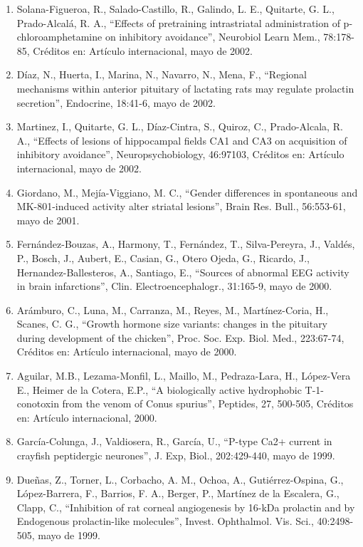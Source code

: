 \begin{enumerate}
\item Solana-Figueroa, R., Salado-Castillo, R., Galindo, L. E., Quitarte, G. L., Prado-Alcalá, R. A., “Effects of pretraining intrastriatal 
administration of p-chloroamphetamine on inhibitory avoidance”, Neurobiol Learn Mem., 78:178-85, Créditos en: Artículo internacional, mayo de 
2002.

\item Díaz, N., Huerta, I., Marina, N., Navarro, N., Mena, F., “Regional mechanisms within anterior pituitary of lactating rats may regulate 
prolactin secretion”, Endocrine, 18:41-6, mayo de 2002.

\item Martinez, I., Quitarte, G. L., Díaz-Cintra, S., Quiroz, C., Prado-Alcala, R. A., “Effects of lesions of hippocampal fields CA1 and CA3 
on 
acquisition of inhibitory avoidance”, Neuropsychobiology, 46:97103, Créditos en: Artículo internacional, mayo de 2002.

\item Giordano, M., Mejía-Viggiano, M. C., “Gender differences in spontaneous and MK-801-induced activity alter striatal lesions”, Brain Res. 
Bull., 56:553-61, mayo de 2001.

\item Fernández-Bouzas, A., Harmony, T., Fernández, T., Silva-Pereyra, J., Valdés, P., Bosch, J., Aubert, E., Casian, G., Otero Ojeda, G., 
Ricardo, 
J., Hernandez-Ballesteros, A., Santiago, E., “Sources of abnormal EEG activity in brain infarctions”, Clin. Electroencephalogr., 31:165-9, 
mayo de 2000.

\item Arámburo, C., Luna, M., Carranza, M., Reyes, M., Martínez-Coria, H., Scanes, C. G., “Growth hormone size variants: changes in the 
pituitary 
during development of the chicken”, Proc. Soc. Exp. Biol. Med., 223:67-74, Créditos en: Artículo internacional, mayo de 2000.

\item Aguilar, M.B., Lezama-Monfil, L., Maillo, M., Pedraza-Lara, H., López-Vera E., Heimer de la Cotera, E.P., “A biologically active 
hydrophobic 
T-1-conotoxin from the venom of Conus spurius”, Peptides, 27, 500-505, Créditos en: Artículo internacional, 2000.

\item García-Colunga, J., Valdiosera, R., García, U., “P-type Ca2+ current in crayfish peptidergic neurones”, J. Exp, Biol., 202:429-440, 
mayo de 
1999.

\item Dueñas, Z., Torner, L., Corbacho, A. M., Ochoa, A., Gutiérrez-Ospina, G., López-Barrera, F., Barrios, F. A., Berger, P., Martínez de la 
Escalera, G., Clapp, C., “Inhibition of rat corneal angiogenesis by 16-kDa prolactin and by Endogenous prolactin-like molecules”, Invest. 
Ophthalmol. Vis. Sci., 40:2498-505, mayo de 1999.


\end{enumerate}
